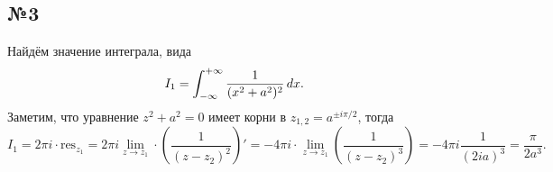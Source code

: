  \subsection*{№3}


 Найдём значение интеграла, вида
 \begin{equation*}
     I_1= \int_{-\infty}^{+\infty} \frac{1}{(x^2 + a^2)^2} \, d x.
 \end{equation*}
 Заметим, что уравнение $z^2 + a^2 = 0$ имеет корни в $z_{1, 2} = a^{\pm i \pi/2}$, тогда
 \begin{equation*}
     I_1 = 2 \pi i \cdot \text{res}_{z_1} = 2 \pi i 
     \lim_{z \to z_1} \cdot \left(
        \frac{1}{(z- z_2)^2}
     \right)' = -4 \pi i \cdot \lim_{z \to z_1} \left(
        \frac{1}{(z-z_2)^3}
     \right) = - 4 \pi i \frac{1}{(2 i a)^3} = \frac{\pi}{2 a^3}.
 \end{equation*}

